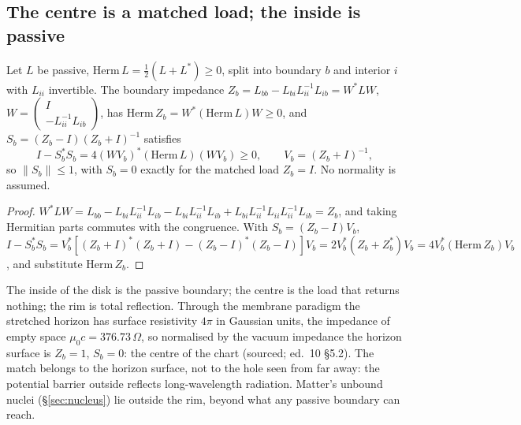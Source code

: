 \subsection{The centre is a matched load; the inside is passive}
\begin{proposition}\label{prop:schurcayley}
Let $L$ be passive, $\mathrm{Herm}\,L=\tfrac12(L+L^*)\ge0$, split into boundary $b$ and interior $i$ with $L_{ii}$ invertible. The boundary impedance $Z_b=L_{bb}-L_{bi}L_{ii}^{-1}L_{ib}=W^*LW$, $W=\begin{pmatrix}I\\-L_{ii}^{-1}L_{ib}\end{pmatrix}$, has $\mathrm{Herm}\,Z_b=W^*(\mathrm{Herm}\,L)W\ge0$, and $S_b=(Z_b-I)(Z_b+I)^{-1}$ satisfies
\[
I-S_b^*S_b=4(WV_b)^*(\mathrm{Herm}\,L)(WV_b)\ge0,\qquad V_b=(Z_b+I)^{-1},
\]
so $\|S_b\|\le1$, with $S_b=0$ exactly for the matched load $Z_b=I$. No normality is assumed. 
\end{proposition}
\begin{proof}
$W^*LW=L_{bb}-L_{bi}L_{ii}^{-1}L_{ib}-L_{bi}L_{ii}^{-1}L_{ib}+L_{bi}L_{ii}^{-1}L_{ii}L_{ii}^{-1}L_{ib}=Z_b$, and taking Hermitian parts commutes with the congruence. With $S_b=(Z_b-I)V_b$, $I-S_b^*S_b=V_b^*[(Z_b+I)^*(Z_b+I)-(Z_b-I)^*(Z_b-I)]V_b=2V_b^*(Z_b+Z_b^*)V_b=4V_b^*(\mathrm{Herm}\,Z_b)V_b$, and substitute $\mathrm{Herm}\,Z_b$.
\end{proof}
The inside of the disk is the passive boundary; the centre is the load that returns nothing; the rim is total reflection. Through the membrane paradigm the stretched horizon has surface resistivity $4\pi$ in Gaussian units, the impedance of empty space $\mu_0c=376.73\,\Omega$, so normalised by the vacuum impedance the horizon surface is $Z_b=1$, $S_b=0$: the centre of the chart  (sourced; ed.~10 §5.2). The match belongs to the horizon surface, not to the hole seen from far away: the potential barrier outside reflects long-wavelength radiation. Matter's unbound nuclei (§\ref{sec:nucleus}) lie outside the rim, beyond what any passive boundary can reach.

